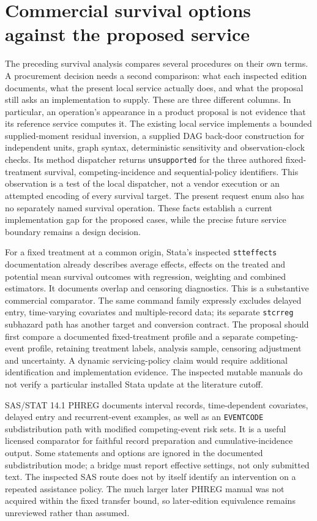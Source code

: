 \section{Commercial survival options against the proposed service}
\label{exec16:commercial-matrix}

The preceding survival analysis compares several procedures on their own
terms. A procurement decision needs a second comparison: what each inspected
edition documents, what the present local service actually does, and what the
proposal still asks an implementation to supply. These are three different
columns. In particular, an operation's appearance in a product proposal is
not evidence that its reference service computes it. The existing local
service implements a bounded supplied-moment residual inversion, a supplied
DAG back-door construction for independent units, graph syntax, deterministic
sensitivity and observation-clock checks. Its method dispatcher returns
\texttt{unsupported} for the three authored fixed-treatment survival,
competing-incidence and sequential-policy identifiers. This observation is a
test of the local dispatcher, not a vendor execution or an attempted encoding
of every survival target. The present request enum also has no separately
named survival operation. These facts establish a current implementation gap
for the proposed cases, while the precise future service boundary remains a
design decision.
\citep{exec16_commercial_runtime}

For a fixed treatment at a common origin, Stata's inspected
\texttt{stteffects} documentation already describes average effects, effects
on the treated and potential mean survival outcomes with regression,
weighting and combined estimators. It documents overlap and censoring
diagnostics. This is a substantive commercial comparator. The same command
family expressly excludes delayed entry, time-varying covariates and
multiple-record data; its separate \texttt{stcrreg} subhazard path has another
target and conversion contract. The proposal should first compare a
documented fixed-treatment profile and a separate competing-event profile,
retaining treatment labels, analysis sample, censoring adjustment and
uncertainty. A dynamic servicing-policy claim would require additional
identification and implementation evidence. The inspected mutable manuals
do not verify a particular installed Stata update at the literature cutoff.
\citep{exec14_survival_stata,exec14_survival_stata_competing}

SAS/STAT 14.1 PHREG documents interval records, time-dependent covariates,
delayed entry and recurrent-event examples, as well as an
\texttt{EVENTCODE} subdistribution path with modified competing-event risk
sets. It is a useful licensed comparator for faithful record preparation and
cumulative-incidence output. Some statements and options are ignored in the
documented subdistribution mode; a bridge must report effective settings,
not only submitted text. The inspected SAS route does not by itself identify
an intervention on a repeated assistance policy. The much larger later PHREG
manual was not acquired within the fixed transfer bound, so later-edition
equivalence remains unreviewed rather than assumed.
\citep{exec14_survival_sas}

